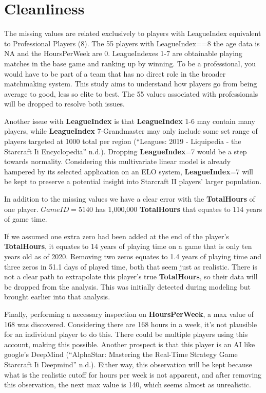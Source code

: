 \documentclass[]{article}
\begin{document}
\hypertarget{cleanliness}{%
\section{Cleanliness}\label{cleanliness}}

The missing values are related exclusively to players with LeagueIndex
equivalent to Professional Players (8). The 55 players with
LeagueIndex==8 the age data is NA and the HoursPerWeek are 0.
LeagueIndexes 1-7 are obtainable playing matches in the base game and
ranking up by winning. To be a professional, you would have to be part
of a team that has no direct role in the broader matchmaking system.
This study aims to understand how players go from being average to good,
less so elite to best. The 55 values associated with professionals will
be dropped to resolve both issues.

Another issue with \textbf{LeagueIndex} is that \textbf{LeagueIndex} 1-6
may contain many players, while \textbf{LeagueIndex} 7-Grandmaster may
only include some set range of players targeted at 1000 total per region
(``Leagues: 2019 - Liquipedia - the Starcraft Ii Encyclopedia'' n.d.).
Dropping \textbf{LeagueIndex}=7 would be a step towards normality.
Considering this multivariate linear model is already hampered by its
selected application on an ELO system, \textbf{LeagueIndex}=7 will be
kept to preserve a potential insight into Starcraft II players' larger
population.

In addition to the missing values we have a clear error with the
\textbf{TotalHours} of one player. \(GameID = 5140\) has 1,000,000
\textbf{TotalHours} that equates to 114 years of game time.

If we assumed one extra zero had been added at the end of the player's
\textbf{TotalHours}, it equates to 14 years of playing time on a game
that is only ten years old as of 2020. Removing two zeros equates to 1.4
years of playing time and three zeros in 51.1 days of played time, both
that seem just as realistic. There is not a clear path to extrapolate
this player's true \textbf{TotalHours}, so their data will be dropped
from the analysis. This was initially detected during modeling but
brought earlier into that analysis.

Finally, performing a necessary inspection on \textbf{HoursPerWeek}, a
max value of 168 was discovered. Considering there are 168 hours in a
week, it's not plausible for an individual player to do this. There
could be multiple players using this account, making this possible.
Another prospect is that this player is an AI like google's DeepMind
(``AlphaStar: Mastering the Real-Time Strategy Game Starcraft Ii
\textbar{} Deepmind'' n.d.). Either way, this observation will be kept
because what is the realistic cutoff for hours per week is not apparent,
and after removing this observation, the next max value is 140, which
seems almost as unrealistic.
\end{document}
